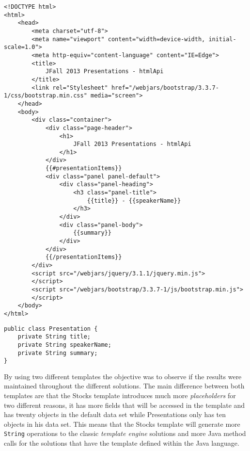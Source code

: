 \bigskip


\begin{lstlisting}[caption={Stocks Template - Mustache},captionpos=b,label={lst:mustachepresentationstemplate}]
<!DOCTYPE html>
<html>
	<head>
		<meta charset="utf-8">
		<meta name="viewport" content="width=device-width, initial-scale=1.0">
		<meta http-equiv="content-language" content="IE=Edge">
		<title>
			JFall 2013 Presentations - htmlApi
		</title>
		<link rel="Stylesheet" href="/webjars/bootstrap/3.3.7-1/css/bootstrap.min.css" media="screen">
	</head>
	<body>
		<div class="container">
			<div class="page-header">
				<h1>
					JFall 2013 Presentations - htmlApi
				</h1>
			</div>
			{{#presentationItems}}
			<div class="panel panel-default">
				<div class="panel-heading">
					<h3 class="panel-title">
						{{title}} - {{speakerName}}
					</h3>
				</div>
				<div class="panel-body">
					{{summary}}
				</div>
			</div>
			{{/presentationItems}}
		</div>
		<script src="/webjars/jquery/3.1.1/jquery.min.js">
		</script>
		<script src="/webjars/bootstrap/3.3.7-1/js/bootstrap.min.js">
		</script>
	</body>
</html>
\end{lstlisting}

\bigskip


\begin{minipage}{\linewidth}
\begin{lstlisting}[caption={Presentation Data Type},captionpos=b,label={lst:presentation}]
public class Presentation {
    private String title;
    private String speakerName;
    private String summary;
}
\end{lstlisting}
\end{minipage}

\noindent
By using two different templates the objective was to observe if the results were maintained throughout the different solutions. The main difference between both templates are that the Stocks template introduces much more \textit{placeholders} for two different reasons, it has more fields that will be accessed in the template and has twenty objects in the default data set while Presentations only has ten objects in his data set. This means that the Stocks template will generate more \texttt{String} operations to the classic \textit{template engine} solutions and more Java method calls for the solutions that have the template defined within the Java language.  

